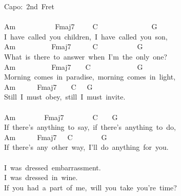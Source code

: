 \documentclass[]{book}
\begin{document}
Capo:~2nd~Fret\\
~\\
Am~~~~~~~~~~~Fmaj7~~~~~C~~~~~~~~~~~~~~~G\\
I~have~called~you~children,~I~have~called~you~son,\\
Am~~~~~~~~~~Fmaj7~~~~~~C~~~~~~~~~~~G\\
What~is~there~to~answer~when~I'm~the~only~one?\\
Am~~~~~~~~~~Fmaj7~~~~C~~~~~~~~~~~~~G\\
Morning~comes~in~paradise,~morning~comes~in~light,\\
Am~~~~~~Fmaj7~~~~C~~~G\\
Still~I~must~obey,~still~I~must~invite.\\
~\\
\hspace*{0.333em}\hspace*{0.333em}\hspace*{0.333em}\hspace*{0.333em}\hspace*{0.333em}\hspace*{0.333em}\hspace*{0.333em}\hspace*{0.333em}\hspace*{0.333em}\hspace*{0.333em}\hspace*{0.333em}Am~~~~~~~~Fmaj7~~~~~~~~C~~~~G\\
If~there's~anything~to~say,~if~there's~anything~to~do,\\
\hspace*{0.333em}\hspace*{0.333em}\hspace*{0.333em}\hspace*{0.333em}\hspace*{0.333em}\hspace*{0.333em}\hspace*{0.333em}\hspace*{0.333em}\hspace*{0.333em}\hspace*{0.333em}\hspace*{0.333em}Am~~~~~~Fmaj7~~~C~~~~~~~~G\\
If~there's~any~other~way,~I'll~do~anything~for~you.\\
~\\
I~was~dressed~embarrassment.~\\
I~was~dressed~in~wine.~\\
If~you~had~a~part~of~me,~will~you~take~you're~time?~\\
\end{document}
